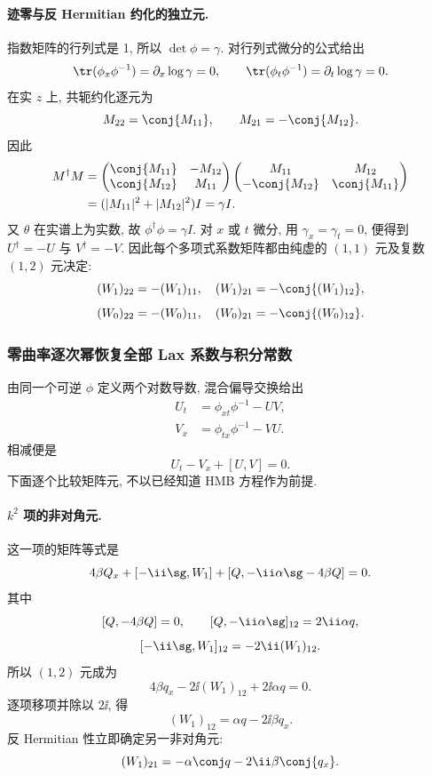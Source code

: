 \paragraph{迹零与反 Hermitian 约化的独立元.}
指数矩阵的行列式是 1, 所以 $\det\phi=\gamma$.
对行列式微分的公式给出
\[
\tr(\phi_x\phi^{-1})=\partial_x\log\gamma=0,\qquad
\tr(\phi_t\phi^{-1})=\partial_t\log\gamma=0.
\]
在实 $z$ 上, 共轭约化逐元为
\[
M_{22}=\conj{M_{11}},\qquad
M_{21}=-\conj{M_{12}}.
\]
因此
\[
\begin{aligned}
M^\dagger M
&=\begin{pmatrix}
\conj{M_{11}}&-M_{12}\\
\conj{M_{12}}&M_{11}
\end{pmatrix}
\begin{pmatrix}
M_{11}&M_{12}\\
-\conj{M_{12}}&\conj{M_{11}}
\end{pmatrix}\\
&=(|M_{11}|^2+|M_{12}|^2)I=\gamma I.
\end{aligned}
\]
又 $\theta$ 在实谱上为实数, 故 $\phi^\dagger\phi=\gamma I$.
对 $x$ 或 $t$ 微分, 用 $\gamma_x=\gamma_t=0$,
便得到 $ U^\dagger=- U$ 与
$ V^\dagger=- V$.
因此每个多项式系数矩阵都由纯虚的 $(1,1)$ 元及复数 $(1,2)$ 元决定:
\[
(W_1)_{22}=-(W_1)_{11},\quad
(W_1)_{21}=-\conj{(W_1)_{12}},
\]
\[
(W_0)_{22}=-(W_0)_{11},\quad
(W_0)_{21}=-\conj{(W_0)_{12}}.
\]

\subsubsection*{零曲率逐次幂恢复全部 Lax 系数与积分常数}
由同一个可逆 $\phi$ 定义两个对数导数,
混合偏导交换给出
\[
\begin{aligned}
 U_t
&=\phi_{xt}\phi^{-1}- U V,\\
 V_x
&=\phi_{tx}\phi^{-1}- V U.
\end{aligned}
\]
相减便是
\[
 U_t- V_x+[ U, V]=0.
\]
下面逐个比较矩阵元, 不以已经知道 HMB 方程作为前提.

\paragraph{$k^2$ 项的非对角元.}
这一项的矩阵等式是
\[
4\beta Q_x+[-\ii\sg,W_1]+[Q,-\ii\alpha\sg-4\beta Q]=0.
\]
其中
\[
[Q,-4\beta Q]=0,\qquad
[Q,-\ii\alpha\sg]_{12}=2\ii\alpha q,
\]
\[
[-\ii\sg,W_1]_{12}=-2\ii(W_1)_{12}.
\]
所以 $(1,2)$ 元成为
\[
4\beta q_x-2\ii(W_1)_{12}+2\ii\alpha q=0.
\]
逐项移项并除以 $2\ii$, 得
\[
(W_1)_{12}=\alpha q-2\ii\beta q_x.
\]
反 Hermitian 性立即确定另一非对角元:
\[
(W_1)_{21}=-\alpha\conj q-2\ii\beta\conj{q_x}.
\]

